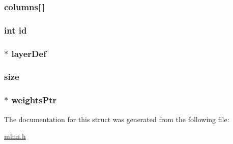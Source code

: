 \subsubsection[{columns}]{ columns\mbox{[}$\,$\mbox{]}}\label{struct_layer_ab534c9bc589a82a94c47661c9422f52a}
\hypertarget{struct_layer_a7441ef0865bcb3db9b8064dd7375c1ea}{}
\subsubsection[{id}]{\setlength{\rightskip}{0pt plus 5cm}int id}\label{struct_layer_a7441ef0865bcb3db9b8064dd7375c1ea}
\hypertarget{struct_layer_afd960456640bc70ae4e7a5eb92e25457}{}
\subsubsection[{layer\+Def}]{$\ast$ layer\+Def}\label{struct_layer_afd960456640bc70ae4e7a5eb92e25457}
\hypertarget{struct_layer_aab34baa6cb3e7bebfb7f4ba88a0ffbda}{}
\subsubsection[{size}]{ size}\label{struct_layer_aab34baa6cb3e7bebfb7f4ba88a0ffbda}
\hypertarget{struct_layer_aba0c89d93d01078126869da17a931b5b}{}
\subsubsection[{weights\+Ptr}]{$\ast$ weights\+Ptr}\label{struct_layer_aba0c89d93d01078126869da17a931b5b}


The documentation for this struct was generated from the following file\+:\begin{DoxyCompactItemize}
\item 
\hyperlink{mlnn_8h}{mlnn.\+h}\end{DoxyCompactItemize}
